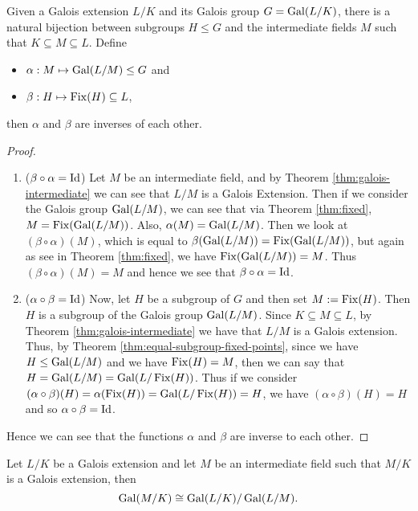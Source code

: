 \begin{theorem} \label{thm:fundamental-theorem} Given a Galois extension $L/K$ and its Galois group $G = \operatorname{Gal}(L/K)$, there is a natural bijection between subgroups $H\leq G$ and the intermediate fields $M$ such that $K \subseteq M \subseteq L$. Define

\begin{itemize}
    \item $\alpha:M \mapsto \operatorname{Gal}(L/M) \leq G$ and
    \item $\beta:H \mapsto \operatorname{Fix}(H) \subseteq L$,
\end{itemize}
then $\alpha$ and $\beta$ are inverses of each other.
\end{theorem}
\begin{proof}
\begin{enumerate}[label=(\roman*)]

 \item ($\beta \circ \alpha = \operatorname{Id}$) Let $M$ be an intermediate field, and by Theorem \ref{thm:galois-intermediate} we can see that $L/M$ is a Galois Extension. Then if we consider the Galois group $\operatorname{Gal}(L/M)$, we can see that via Theorem \ref{thm:fixed}, $M = \operatorname{Fix}(\operatorname{Gal}(L/M))$. Also, $\alpha(M) = \operatorname{Gal}(L/M)$. Then we look at $(\beta \circ \alpha)(M)$, which is equal to $\beta(\operatorname{Gal}(L/M)) = \operatorname{Fix}(\operatorname{Gal}(L/M))$, but again as see in Theorem \ref{thm:fixed}, we have $\operatorname{Fix}(\operatorname{Gal}(L/M)) = M$. Thus $(\beta \circ \alpha)(M) = M$ and hence we see that $\beta \circ \alpha = \operatorname{Id}$.

 \item ($\alpha \circ \beta = \operatorname{Id}$) Now, let $H$ be a subgroup of $G$ and then set $M :=\operatorname{Fix}(H)$. Then $H$ is a subgroup of the Galois group $\operatorname{Gal}(L/M)$. Since $K \subseteq M \subseteq L$, by Theorem \ref{thm:galois-intermediate} we have that $L/M$ is a Galois extension. Thus, by Theorem \ref{thm:equal-subgroup-fixed-points}, since we have $H\leq \operatorname{Gal}(L/M)$ and we have $\operatorname{Fix}(H)=M$, then we can say that $H=\operatorname{Gal}(L/M)=\operatorname{Gal}(L/\operatorname{Fix}(H))$. Thus if we consider $(\alpha \circ \beta)(H) = \alpha(\operatorname{Fix}(H)) = \operatorname{Gal}(L/\operatorname{Fix}(H))= H $, we have $(\alpha \circ \beta)(H) = H$ and so $\alpha \circ \beta = \operatorname{Id}$.
\end{enumerate}
Hence we can see that the functions $\alpha$ and $\beta$ are inverse to each other.
\end{proof}



\begin{theorem} \label{thm:correspondence-quotient}
    Let $L / K$ be a Galois extension and let $M$ be an intermediate field such that $M /K$ is a Galois extension, then 
    $$\operatorname{Gal}(M / K) \cong \operatorname{Gal}(L / K) / \operatorname{Gal}(L / M). $$
\end{theorem}

